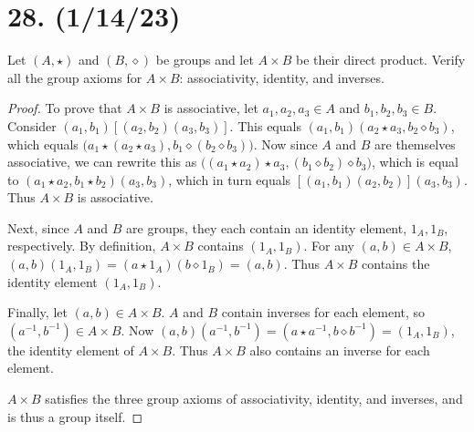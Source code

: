 \documentclass{article}
\begin{document}
\section*{28. (1/14/23)}

Let $(A, \star)$ and $(B, \diamond)$ be groups and let $A \times B$ be their direct product. Verify all the group axioms for $A \times B$: associativity, identity, and inverses.

\begin{proof}
      To prove that $A \times B$ is associative, let $a_1, a_2, a_3 \in A$ and $b_1, b_2, b_3 \in B$. Consider $(a_1, b_1)[(a_2, b_2)(a_3, b_3)]$. This equals $(a_1, b_1)(a_2 \star a_3, b_2 \diamond b_3)$, which equals $\bigl(a_1 \star (a_2 \star a_3), b_1 \diamond (b_2 \diamond b_3)\bigr)$. Now since $A$ and $B$ are themselves associative, we can rewrite this as $\bigl((a_1 \star a_2) \star a_3, (b_1 \diamond b_2) \diamond b_3\bigr)$, which is equal to $(a_1 \star a_2, b_1 \star b_2)(a_3, b_3)$, which in turn equals $[(a_1, b_1)(a_2, b_2)](a_3, b_3)$. Thus $A \times B$ is associative.

      Next, since $A$ and $B$ are groups, they each contain an identity element, $1_A, 1_B$, respectively. By definition, $A \times B$ contains $(1_A, 1_B)$. For any $(a, b) \in A \times B$, $(a, b)(1_A, 1_B) = (a \star 1_A)(b \diamond 1_B) = (a, b)$. Thus $A \times B$ contains the identity element $(1_A, 1_B)$.

      Finally, let $(a, b) \in A \times B$. $A$ and $B$ contain inverses for each element, so $(a^{-1}, b^{-1}) \in A \times B$. Now $(a, b)(a^{-1}, b^{-1}) = (a \star a^{-1}, b \diamond b^{-1}) = (1_A, 1_B)$, the identity element of $A \times B$. Thus $A \times B$ also contains an inverse for each element.

      $A \times B$ satisfies the three group axioms of associativity, identity, and inverses, and is thus a group itself.
\end{proof}
\end{document}
